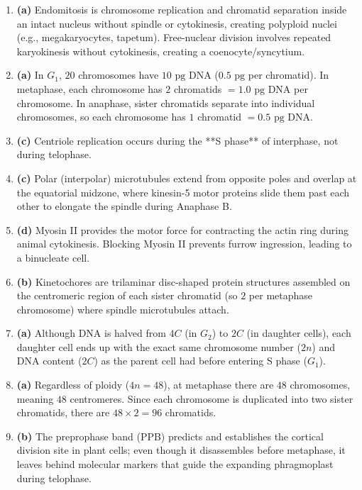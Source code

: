 \documentclass[11pt,a4paper]{article}
\begin{document}
\begin{enumerate}[label=\textbf{\arabic*.}, leftmargin=*]
\item \textbf{(a)} Endomitosis is chromosome replication and chromatid separation inside an intact nucleus without spindle or cytokinesis, creating polyploid nuclei (e.g., megakaryocytes, tapetum). Free-nuclear division involves repeated karyokinesis without cytokinesis, creating a coenocyte/syncytium.

\item \textbf{(a)} In $G_1$, $20$ chromosomes have $10\text{ pg}$ DNA ($0.5\text{ pg}$ per chromatid). In metaphase, each chromosome has $2$ chromatids $= 1.0\text{ pg}$ DNA per chromosome. In anaphase, sister chromatids separate into individual chromosomes, so each chromosome has $1$ chromatid $= 0.5\text{ pg}$ DNA.

\item \textbf{(c)} Centriole replication occurs during the **S phase** of interphase, not during telophase.

\item \textbf{(c)} Polar (interpolar) microtubules extend from opposite poles and overlap at the equatorial midzone, where kinesin-5 motor proteins slide them past each other to elongate the spindle during Anaphase B.

\item \textbf{(d)} Myosin II provides the motor force for contracting the actin ring during animal cytokinesis. Blocking Myosin II prevents furrow ingression, leading to a binucleate cell.

\item \textbf{(b)} Kinetochores are trilaminar disc-shaped protein structures assembled on the centromeric region of each sister chromatid (so $2$ per metaphase chromosome) where spindle microtubules attach.

\item \textbf{(a)} Although DNA is halved from $4C$ (in $G_2$) to $2C$ (in daughter cells), each daughter cell ends up with the exact same chromosome number ($2n$) and DNA content ($2C$) as the parent cell had before entering S phase ($G_1$).

\item \textbf{(a)} Regardless of ploidy ($4n = 48$), at metaphase there are $48$ chromosomes, meaning $48$ centromeres. Since each chromosome is duplicated into two sister chromatids, there are $48 \times 2 = 96$ chromatids.

\item \textbf{(b)} The preprophase band (PPB) predicts and establishes the cortical division site in plant cells; even though it disassembles before metaphase, it leaves behind molecular markers that guide the expanding phragmoplast during telophase.


\end{enumerate}
\end{document}
